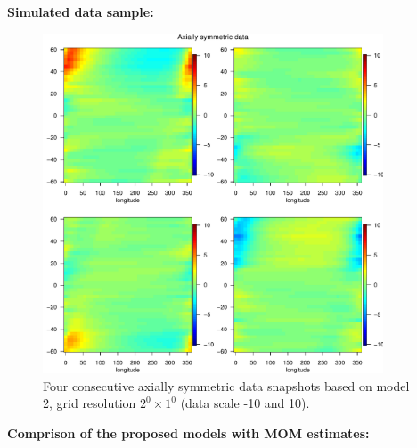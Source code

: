 
%
%




{\bf Simulated data sample:}

\begin{figure}[H]
\label{grid_plot_model2}
\begin{center}
\includegraphics [width=0.9\textwidth ]{graphs/Data_sample_120_model2.pdf}
\caption{Four consecutive axially symmetric data snapshots based on model 2, grid resolution $2^0\times 1^0$ (data scale -10 and 10).}
\end{center}
\end{figure}

\newpage
{\bf Comprison of the proposed models with MOM estimates:}



